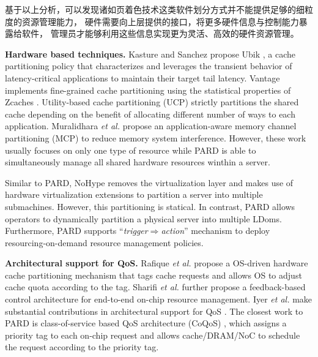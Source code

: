 基于以上分析，可以发现诸如页着色技术这类软件划分方式并不能提供足够的细粒度的资源管理能力，
硬件需要向上层提供的接口，将更多硬件信息与控制能力暴露给软件，
管理员才能够利用这些信息实现更为灵活、高效的硬件资源管理。


\textbf{Hardware based techniques.} Kasture and Sanchez propose Ubik \cite{kasture_ubik:_2014},
a cache partitioning policy that characterizes and leverages the transient
behavior of latency-critical applications to maintain their target tail latency.
Vantage \cite{sanchez_vantage:_2011} implements fine-grained cache partitioning
using the statistical properties of Zcaches \cite{sanchez_zcache:_2010}.
Utility-based cache partitioning (UCP) \cite{qureshi_utility-based_2006}
strictly partitions the shared cache depending on the benefit of allocating
different number of ways to each application.
Muralidhara \emph{et al.} propose an application-aware memory channel
partitioning (MCP) \cite{muralidhara_reducing_2011} to reduce memory system
interference. However, these work usually focuses on only one type of resource while
PARD is able to simultaneously manage all shared hardware resources winthin a server.

Similar to PARD, NoHype \cite{keller_nohype:_2010} removes the virtualization layer
and makes use of hardware virtualization extensions to partition a server into multiple
submachines. However, this partitioning is statical.
In contrast, PARD allows operators to dynamically partition a physical server into
multiple LDoms. Furthermore, PARD supports ``\emph{trigger$\Rightarrow$action}''
mechanism to deploy resourcing-on-demand resource management policies.


\textbf{Architectural support for QoS.}
Rafique \emph{et al.} \cite{Rafique:2006:ASO} propose a OS-driven hardware cache partitioning mechanism that tags
cache requests and allows OS to adjust cache quota according to the tag.
Sharifi \emph{et al.} \cite{sharifi_mete:_2011} further propose a feedback-based
 control architecture for end-to-end on-chip resource management.
Iyer \emph{et al.} make substantial contributions in architectural
support for QoS \cite{herdrich_rate-based_2009, iyer_cqos:_2004, iyer_qos_2007,li_coqos:_2011,li_dynamic_2012}.
The closest work to PARD is class-of-service based QoS architecture (CoQoS) \cite{li_dynamic_2012, li_coqos:_2011},
which assigns a priority tag to each on-chip request and allows cache/DRAM/NoC to
schedule the request according to the priority tag.

